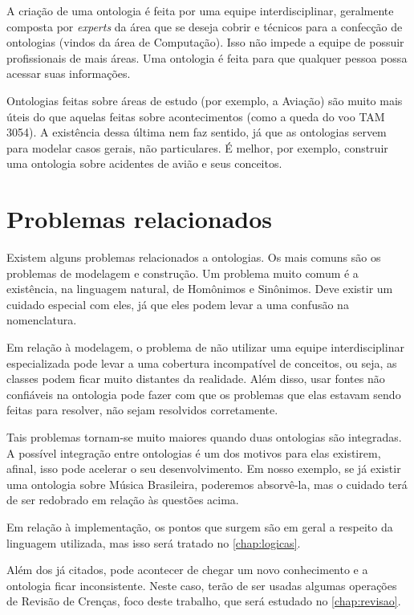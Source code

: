 A criação de uma ontologia é feita por uma equipe interdisciplinar, geralmente composta por \textit{experts} da área que se deseja cobrir e técnicos para a confecção de ontologias (vindos da área de Computação). Isso não impede a equipe de possuir profissionais de mais áreas. Uma ontologia é feita para que qualquer pessoa possa acessar suas informações.

Ontologias feitas sobre áreas de estudo (por exemplo, a Aviação) são muito mais úteis do que aquelas feitas sobre acontecimentos (como a queda do voo TAM 3054). A existência dessa última nem faz sentido, já que as ontologias servem para modelar casos gerais, não particulares. É melhor, por exemplo, construir uma ontologia sobre acidentes de avião e seus conceitos.

\section{Problemas relacionados}

Existem alguns problemas relacionados a ontologias. Os mais comuns são os problemas de modelagem e construção. Um problema muito comum é a existência, na linguagem natural, de Homônimos e Sinônimos. Deve existir um cuidado especial com eles, já que eles podem levar a uma confusão na nomenclatura.

Em relação à modelagem, o problema de não utilizar uma equipe interdisciplinar especializada pode levar a uma cobertura incompatível de conceitos, ou seja, as classes podem ficar muito distantes da realidade. Além disso, usar fontes não confiáveis na ontologia pode fazer com que os problemas que elas estavam sendo feitas para resolver, não sejam resolvidos corretamente.

Tais problemas tornam-se muito maiores quando duas ontologias são integradas. A possível integração entre ontologias é um dos motivos para elas existirem, afinal, isso pode acelerar o seu desenvolvimento. Em nosso exemplo, se já existir uma ontologia sobre Música Brasileira, poderemos absorvê-la, mas o cuidado terá de ser redobrado em relação às questões acima. 

Em relação à implementação, os pontos que surgem são em geral a respeito da linguagem utilizada, mas isso será tratado no \autoref{chap:logicas}.

Além dos já citados, pode acontecer de chegar um novo conhecimento e a ontologia ficar inconsistente. Neste caso, terão de ser usadas algumas operações de Revisão de Crenças, foco deste trabalho, que será estudado no \autoref{chap:revisao}.

